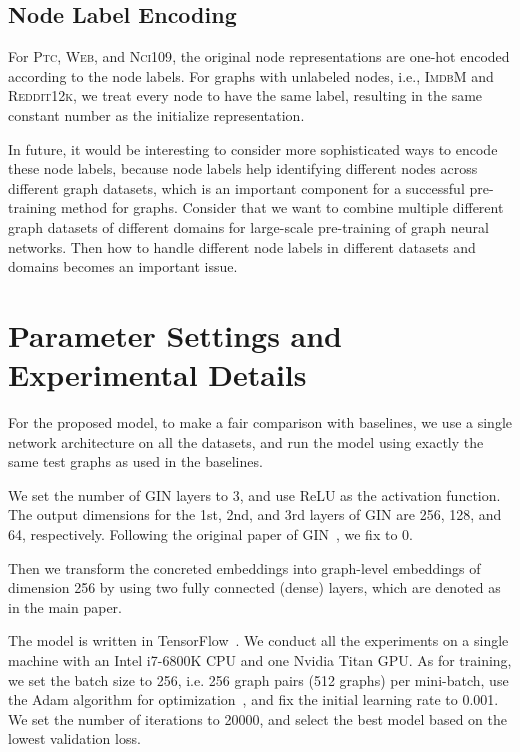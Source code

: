 \documentclass{article}
\newcommand{\gin}{\textsc{GIN}\xspace}
\newcommand{\ptc}{\textsc{Ptc}\xspace}
\newcommand{\imdb}{\textsc{ImdbM}\xspace}
\newcommand{\web}{\textsc{Web}\xspace}
\newcommand{\nci}{\textsc{Nci109}\xspace}
\newcommand{\reddit}{\textsc{Reddit12k}\xspace}
\begin{document}
\subsection{Node Label Encoding}
\label{subsec-nle}



For \ptc, \web, and \nci, the original node representations are one-hot encoded according to the node labels. For graphs with unlabeled nodes, i.e., \imdb and \reddit, we treat every node to have the same label, resulting in the same constant number as the initialize representation. 

In future, it would be interesting to consider more sophisticated ways to encode these node labels, because node labels help identifying different nodes across different graph datasets, which is an important component for a successful pre-training method for graphs. Consider that we want to combine multiple different graph datasets of different domains for large-scale pre-training of graph neural networks. Then how to handle different node labels in different datasets and domains becomes an important issue.






 \section{Parameter Settings and Experimental Details} 
\label{sec-param-set}

For the proposed model, to make a fair comparison with baselines, we use a single network architecture on all the datasets, and run the model using exactly the same test graphs as used in the baselines. 

We set the number of \gin layers to 3, and use ReLU as the activation function. The output dimensions for the 1st, 2nd, and 3rd layers of \gin are 256, 128, and 64, respectively. Following the original paper of \gin~\cite{xu2018powerful}, we fix  to 0.

Then we transform the concreted embeddings into graph-level embeddings of dimension 256 by using two fully connected (dense) layers, which are denoted as  in the main paper. 

The model is written in TensorFlow~\cite{girija2016tensorflow}. We conduct all the experiments on a single machine with an Intel i7-6800K CPU and one Nvidia Titan GPU. As for training, we set the batch size to 256, i.e. 256 graph pairs (512 graphs) per mini-batch, use the Adam algorithm for optimization~\cite{kingma2014adam}, and fix the initial learning rate to 0.001. We set the number of iterations to 20000, and select the best model based on the lowest validation loss.
\end{document}
